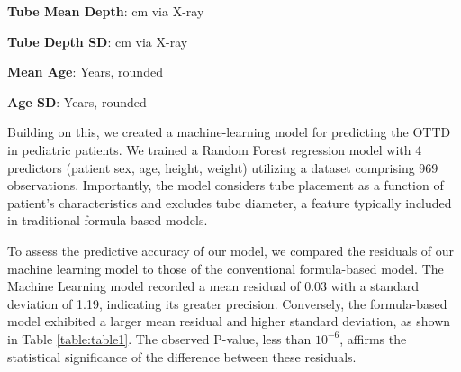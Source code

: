 \documentclass[11pt]{article}
\begin{document}
\begin{table}[h]
\caption{Mean and standard deviation of Optimal Tube Depth based on Sex}
\label{table:table0}
\begin{threeparttable}
\renewcommand{\TPTminimum}{\linewidth}
\begin{tablenotes}
\footnotesize
\item \textbf{Tube Mean Depth}: cm via X-ray
\item \textbf{Tube Depth SD}: cm via X-ray
\item \textbf{Mean Age}: Years, rounded
\item \textbf{Age SD}: Years, rounded
\end{tablenotes}
\end{threeparttable}
\end{table}


Building on this, we created a machine-learning model for predicting the OTTD in pediatric patients. We trained a Random Forest regression model with 4 predictors (patient sex, age, height, weight) utilizing a dataset comprising 969 observations. Importantly, the model considers tube placement as a function of patient's characteristics and excludes tube diameter, a feature typically included in traditional formula-based models. 

To assess the predictive accuracy of our model, we compared the residuals of our machine learning model to those of the conventional formula-based model. The Machine Learning model recorded a mean residual of 0.03 with a standard deviation of 1.19, indicating its greater precision. Conversely, the formula-based model exhibited a larger mean residual and higher standard deviation, as shown in Table \ref{table:table1}. The observed P-value, less than $10^{-6}$, affirms the statistical significance of the difference between these residuals. 
\end{document}
